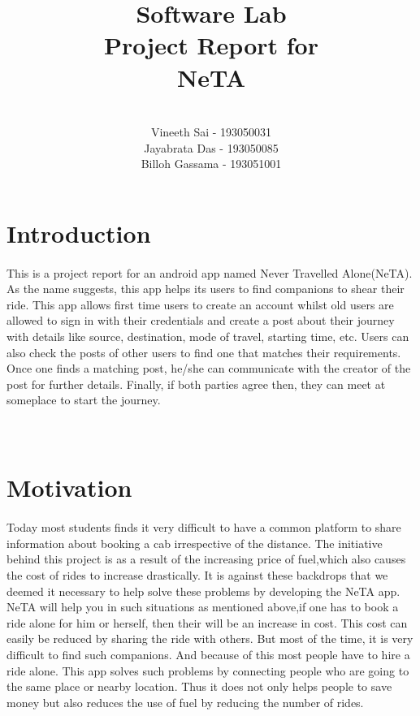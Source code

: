 \documentclass[12pt, a4paper]{article}
\title{\textbf{Software Lab \\ Project Report for\\NeTA }}
\author{\\Vineeth Sai - 193050031\\Jayabrata Das - 193050085\\Billoh Gassama - 193051001}
\begin{document}
\maketitle
{}
\newpage
\tableofcontents
\newpage
{}
\setcounter{page}{1}
\section{Introduction}
\paragraph{}
This is a project report for an android app named Never Travelled Alone(NeTA). As the name suggests, this app helps its users to find companions to shear their ride.  This app allows first time users to create an account whilst old users are allowed to sign in with their credentials and create a post about their journey with details like source, destination, mode of travel, starting time, etc. Users can also check the posts of other users to find one that matches their requirements. Once one finds a matching post, he/she can communicate with the creator of the post for further details.
Finally, if both parties agree then, they can meet at someplace to start the journey. 
\\
\\
\\
\section{Motivation}
\paragraph{}
Today most students finds it very difficult to have a common platform to share information about booking a cab irrespective of the distance. 
The initiative behind this project is as a result of the increasing price of fuel,which also causes the cost of rides to increase drastically.
It is against these backdrops that we deemed it necessary to help solve these problems by developing the NeTA app.
NeTA will help you in such situations as mentioned above,if one has to book a ride alone for him or herself, then their will be an  increase in cost. This cost can easily be reduced by sharing the ride with others. But most of the time, it is very difficult to find such companions. And because of this most people have to hire a ride alone.
This app solves such problems by connecting people who are going to the same place or nearby location. Thus it does not only helps people to save money but also reduces the use of fuel by reducing the number of rides.
\end{document}
